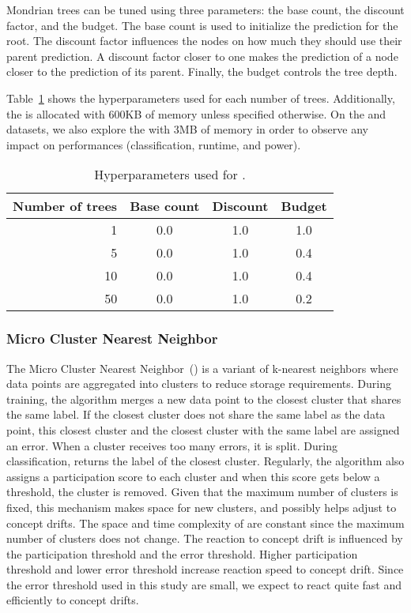 Mondrian trees can be tuned using three
parameters: the base count, the discount factor,
and the budget. The base count is used to
initialize the prediction for the root. The
discount factor influences the nodes on how much
they should use their parent prediction. A
discount factor closer to one makes the prediction
of a node closer to the prediction of its parent.
Finally, the budget controls the tree depth.

Table~\ref{table:hyperparameter-mondrian} shows
the hyperparameters used for each number of trees.
Additionally, the \mondrianforest is allocated
with 600KB of memory unless specified otherwise.
On the \banosdataset and \recofitdataset datasets,
we also explore the \mondrianforest with 3MB of
memory in order to observe any impact on
performances (classification, runtime, and power).
\begin{table}
	\begin{center}
		\begin{tabular}{|| r | c | c | c ||} 
			\hline
			Number of trees &  Base count & Discount & Budget \\ [0.5ex] 
			\hline\hline
			1 & 0.0 & 1.0 & 1.0 \\
			5 & 0.0 & 1.0 & 0.4 \\
			10 & 0.0 & 1.0 & 0.4 \\
			50 & 0.0 & 1.0 & 0.2 \\
			\hline
		\end{tabular}
	\end{center}
	\caption{Hyperparameters used for \mondrianforest.}
		\label{table:hyperparameter-mondrian}
\end{table}
\subsubsection{Micro Cluster Nearest Neighbor~\cite{mc-nn}}
The Micro Cluster Nearest Neighbor~(\mcnn) is a
variant of k-nearest neighbors where data points
are aggregated into clusters to reduce storage
requirements.  During training, the algorithm
merges a new data point to the closest cluster
that shares the same label. If the closest cluster
does not share the same label as the data point,
this closest cluster and the closest cluster with
the same label are assigned an error. When a
cluster receives too many errors, it is split.
During classification, \mcnn returns the label of
the closest cluster.  Regularly, the algorithm
also assigns a participation score to each cluster
and when this score gets below a threshold, the
cluster is removed. Given that the maximum number
of clusters is fixed, this mechanism makes
space for new clusters, and possibly
helps adjust to concept drifts.  
The space and time complexity of \mcnn are
constant since the maximum number of clusters does
not change.
The reaction to concept drift is influenced by the
participation threshold and the error threshold.
Higher participation threshold and lower error
threshold increase reaction speed to concept
drift. Since the error threshold used in this
study are small, we expect \mcnn to react quite
fast and efficiently to concept drifts.

